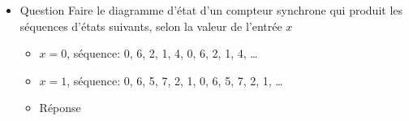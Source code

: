 \documentclass[letter, oneside]{book}
\begin{document}
\begin{itemize}
\item Question
\label{sec:org7cdabd5}
Faire le diagramme d'état d'un compteur synchrone qui produit les
séquences d'états suivants, selon la valeur de l'entrée \(x\)

\begin{itemize}
\item \(x=0\), séquence: 0, 6, 2, 1, 4, 0, 6, 2, 1, 4, \dots{}
\item \(x=1\), séquence: 0, 6, 5, 7, 2, 1, 0, 6, 5, 7, 2, 1, \dots{}
\end{itemize}

\begin{itemize}
\item Réponse
\label{sec:org7095517}
\begin{center}

\end{center}
\end{itemize}
\end{itemize}
\end{document}
